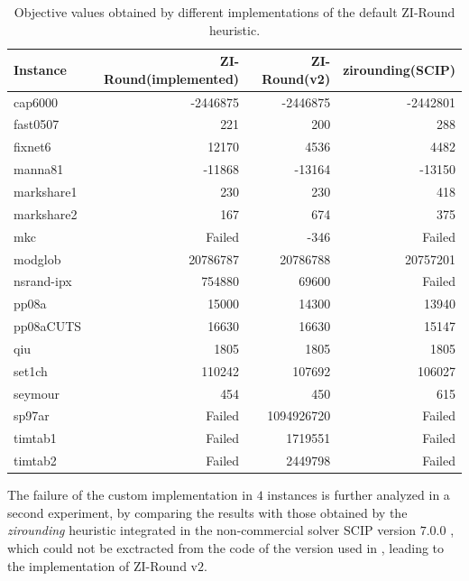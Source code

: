 \documentclass[a4paper,12pt,twoside]{scrbook}
\begin{document}
\begin{table}[]
	\centering
	\begin{tabular}{@{}lrrr@{}}
	\toprule
	Instance   & ZI-Round(implemented) & ZI-Round(v2) & zirounding(SCIP) \\ \midrule
	cap6000    & -2446875              & -2446875     & -2442801         \\
	fast0507   & 221                   & 200          & 288              \\
	fixnet6    & 12170                 & 4536         & 4482             \\
	manna81    & -11868                & -13164       & -13150           \\
	markshare1 & 230                   & 230          & 418              \\
	markshare2 & 167                   & 674          & 375              \\
	mkc        & Failed                & -346      & Failed           \\
	modglob    & 20786787           & 20786788     & 20757201      \\
	nsrand-ipx & 754880                & 69600        & Failed           \\
	pp08a      & 15000                 & 14300        & 13940            \\
	pp08aCUTS  & 16630           & 16630      & 15147      \\
	qiu        & 1805           & 1805      & 1805      \\
	set1ch     & 110242              & 107692     & 106027           \\
	seymour    & 454                   & 450          & 615              \\
	sp97ar     & Failed                & 1094926720   & Failed           \\
	timtab1    & Failed                & 1719551      & Failed           \\
	timtab2    & Failed                & 2449798      & Failed           \\ \bottomrule
	\end{tabular}
	\caption{Objective values obtained by different implementations of the default ZI-Round heuristic.}
	\label{tb:exp-prelim-1}
\end{table}

The failure of the custom implementation in $4$ instances is further analyzed in a second experiment, by comparing the results with those obtained by the \textit{zirounding} heuristic integrated in the non-commercial solver SCIP version $7$.$0$.$0$ \cite{scip}, which could not be exctracted from the code of the version used in \cite{wallace2010}, leading to the implementation of ZI-Round v$2$. \par 
\end{document}
